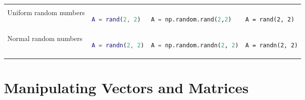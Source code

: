 \documentclass[10pt, landscape]{article}
\begin{document}
\begin{multicols}{2}
\begin{tabular}[]{@{}llll@{}}
\begin{minipage}[t]{0.20\columnwidth}
\end{minipage}\tabularnewline
\begin{minipage}[t]{0.24\columnwidth}\raggedright
Uniform random numbers
\end{minipage} & \begin{minipage}[t]{0.20\columnwidth}\raggedright
\begin{lstlisting}[language=Matlab]
A = rand(2, 2)
\end{lstlisting}

\end{minipage} & \begin{minipage}[t]{0.25\columnwidth}\raggedright
\begin{lstlisting}[language=Python]
A = np.random.rand(2,2)
\end{lstlisting}

\end{minipage} & \begin{minipage}[t]{0.20\columnwidth}\raggedright
\begin{lstlisting}
A = rand(2, 2)
\end{lstlisting}

\end{minipage}\tabularnewline
\begin{minipage}[t]{0.24\columnwidth}\raggedright
Normal random numbers
\end{minipage} & \begin{minipage}[t]{0.20\columnwidth}\raggedright
\begin{lstlisting}[language=Matlab]
A = randn(2, 2)
\end{lstlisting}

\end{minipage} & \begin{minipage}[t]{0.25\columnwidth}\raggedright
\begin{lstlisting}[language=Python]
A = np.random.randn(2, 2)
\end{lstlisting}

\end{minipage} & \begin{minipage}[t]{0.20\columnwidth}\raggedright
\begin{lstlisting}
A = randn(2, 2)
\end{lstlisting}

\end{minipage}\tabularnewline
\bottomrule
\end{tabular}

\section{Manipulating Vectors and
Matrices}\label{manipulating-vectors-and-matrices}


\end{multicols}
\end{document}
